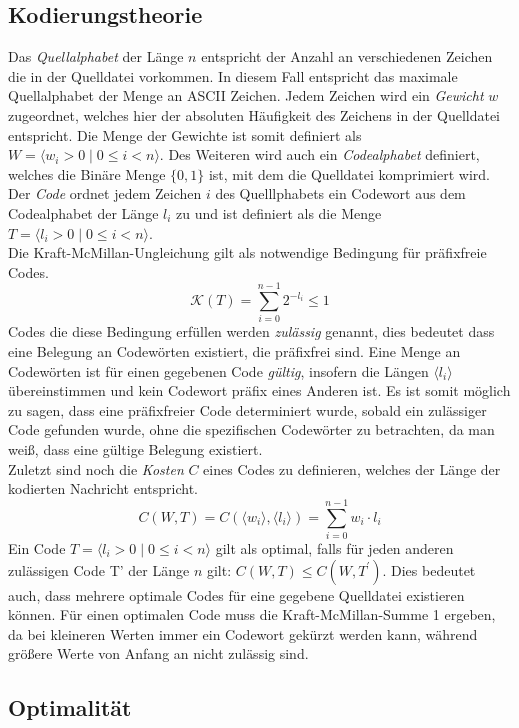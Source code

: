 \documentclass[course=erap]{aspdoc}
\begin{document}
\subsection{Kodierungstheorie}

Das \textit{Quellalphabet} der Länge $n$ entspricht der Anzahl an verschiedenen Zeichen die in der Quelldatei vorkommen. In diesem Fall entspricht das maximale Quellalphabet der Menge an ASCII Zeichen.
Jedem Zeichen wird ein \textit{Gewicht} $w$ zugeordnet, welches hier der absoluten Häufigkeit des Zeichens in der Quelldatei entspricht. Die Menge der Gewichte ist somit definiert als $W = \langle w_i > 0 \mid 0 \le i < n \rangle $.
Des Weiteren wird auch ein \textit{Codealphabet} definiert, welches die Binäre Menge $\lbrace0, 1\rbrace$ ist, mit dem die Quelldatei komprimiert wird.
Der \textit{Code} ordnet jedem Zeichen $i$ des Quelllphabets ein Codewort aus dem Codealphabet der Länge $l_i$ zu und ist definiert als die Menge $T = \langle l_i > 0 \mid 0 \le i < n \rangle$.\\
Die Kraft-McMillan-Ungleichung gilt als notwendige Bedingung für präfixfreie Codes.
$$\mathcal{K}(T) = \sum_{i=0}^{n-1} 2^{-l_i} \le 1$$
Codes die diese Bedingung erfüllen werden \textit{zulässig} genannt, dies bedeutet dass eine Belegung an Codewörten existiert, die präfixfrei sind.
Eine Menge an Codewörten ist für einen gegebenen Code \textit{gültig}, insofern die Längen $\langle l_i \rangle$ übereinstimmen und kein Codewort präfix eines Anderen ist.
Es ist somit möglich zu sagen, dass eine präfixfreier Code determiniert wurde, sobald ein zulässiger Code gefunden wurde, ohne die spezifischen Codewörter zu betrachten, da man weiß, dass eine gültige Belegung existiert.\\
Zuletzt sind noch die \textit{Kosten} $C$ eines Codes zu definieren, welches der Länge der kodierten Nachricht entspricht.
$$C(W,T) = C(\langle w_i \rangle,\langle l_i \rangle) = \sum_{i=0}^{n-1} w_i \cdot l_i $$
Ein Code $T = \langle l_i > 0 \mid 0 \le i < n \rangle$ gilt als optimal, falls für jeden anderen zulässigen Code T' der Länge $n$ gilt: $C(W,T) \le C(W,T^{\prime})$. Dies bedeutet auch, dass mehrere optimale Codes für eine gegebene Quelldatei existieren können.
Für einen optimalen Code muss die Kraft-McMillan-Summe 1 ergeben, da bei kleineren Werten immer ein Codewort gekürzt werden kann, während größere Werte von Anfang an nicht zulässig sind.

\subsection{Optimalität}
\end{document}

